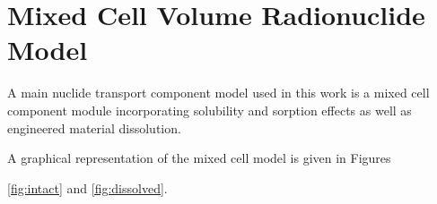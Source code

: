 \section{Mixed Cell Volume Radionuclide Model}\label{sec:mixed_cell}







A main nuclide transport component model used in this work is a mixed cell 
component module incorporating solubility and sorption effects as well as  
engineered material dissolution.

A graphical representation of the mixed cell model is given in Figures 

\ref{fig:intact} and \ref{fig:dissolved}. 

